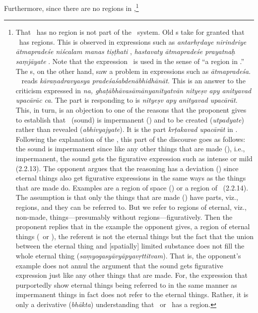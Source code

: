 Furthermore,%
 since there are no regions in \atman,\footnote{That \atman\ has no region is not part of the \Vaisesika\ system. Old \Vaisesika s take for granted that \atman\ has regions. This is observed in expressions such as \emph{antarhṛ\-da\-ye ni\-ri\-ndri\-ye ā\-tma\-pra\-de\-śe ni\-śca\-lam ma\-nas ti\-ṣṭha\-ti} \citep[183]{pdhs}, \emph{ha\-sta\-vaty ā\-tma\-pra\-de\-śe pra\-yatnaḥ saṃjā\-ya\-te} \citep[297]{pdhs}. Note that the expression \atmapradesa\ is used in the sense of “a region in \atman.” The \Naiyayika s, on the other hand, saw a problem in expressions such as \emph{ātmapradeśa}. \Nyayasutra\  reads \emph{kāra\-ṇa\-dra\-vya\-sya pra\-deśa\-śabde\-nā\-bhi\-dhā\-nāt}. This is an answer to the criticism expressed in  \emph{na, ghaṭā\-bhā\-va\-sā\-mā\-nya\-ni\-tya\-tvān ni\-tye\-ṣv apy a\-ni\-tya\-vad upa\-cā\-rāc ca}. The part  is responding to is \emph{nityeṣv apy anityavad upacārāt}. This, in turn, is an objection to one of the reasons that the proponent gives to establish that \sabda\ (sound) is impermanent (\anitya) and to be created (\emph{utpadyate}) rather than revealed (\emph{abhivyajyate}). It is the part \emph{krṭakavad upacārāt} in . Following the explanation of the \NBh, this part of the discourse goes as follows: the sound is impermanent since like any other things that are made (\krtaka), i.e., impermanent, the sound gets the figurative expression such as intense or mild (2.2.13). The opponent argues that the reasoning has a deviation (\vyabhicara) since eternal things also get figurative expressions in the same ways as the things that are made do. Examples are a region of space (\akasa) or a region of \atman\ (2.2.14). The assumption is that only the things that are made (\krtaka) have parts, viz., regions, and they can be referred to. But we refer to regions of eternal, viz., non-made, things---presumably without regions---figuratively. Then the proponent replies that in the example the opponent gives, a region of eternal things (\akasa\ or \atman), the referent is not the eternal things but the fact that the union between the eternal thing and [spatially] limited substance does not fill the whole eternal thing (\emph{saṃyogasyāvyāpyavṛttitvam}). That is, the opponent's example does not annul the argument that the sound gets figurative expression just like any other things that are made. For, the expression that purportedly show eternal things being referred to in the same manner as impermanent things in fact does not refer to the eternal things. Rather, it is only a derivative (\emph{bhākta}) understanding that \akasa\ or \atman\ has a region.

}
